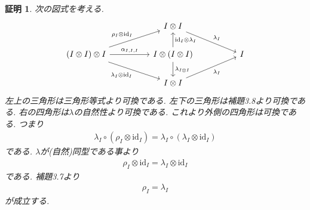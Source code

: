\documentclass[a4paper,12pt]{ltjsarticle}
\theoremstyle{break}
\newtheorem*{prf}{証明}
\newcommand{\id}{\mathrm{id}}
\newcommand{\ci}{\circ}
\newcommand{\al}{\alpha}
\newcommand{\la}{\lambda}
\newcommand{\ot}{\otimes}
\numberwithin{equation}{section}
\begin{document}
\begin{prf}
  次の図式を考える. 
  \[\begin{tikzcd}
    && {I \ot I} \\
    {(I \ot I) \ot I} && {I \ot (I \ot I)} && I \\
    && {I \ot I}
    \arrow["{\rho_I \ot \id_I}", from=2-1, to=1-3]
    \arrow["{\al_{I,I,I}}", from=2-1, to=2-3]
    \arrow["{\id_I \ot \la_I}"', from=2-3, to=1-3]
    \arrow["{\la_I}", from=1-3, to=2-5]
    \arrow["{\la_I \ot \id_I}"', from=2-1, to=3-3]
    \arrow["{\la_I}"', from=3-3, to=2-5]
    \arrow["{\la_{I \ot I}}", from=2-3, to=3-3]
  \end{tikzcd}\]
  左上の三角形は三角形等式より可換である. 
  左下の三角形は補題3.8より可換である. 
  右の四角形は$\la$の自然性より可換である. 
  これより外側の四角形は可換である. 
  つまり
  \begin{align*}
    \la_I \ci (\rho_I \ot \id_I)=\la_I \ci (\la_I \ot \id_I)
  \end{align*}
  である. 
  $\la$が(自然)同型である事より
  \begin{align*}
    \rho_I \ot \id_I=\la_I \ot \id_I
  \end{align*}
  である. 
  補題3.7より
  \begin{align*}
    \rho_I=\la_I
  \end{align*}
  が成立する. 
\end{prf}
\end{document}
